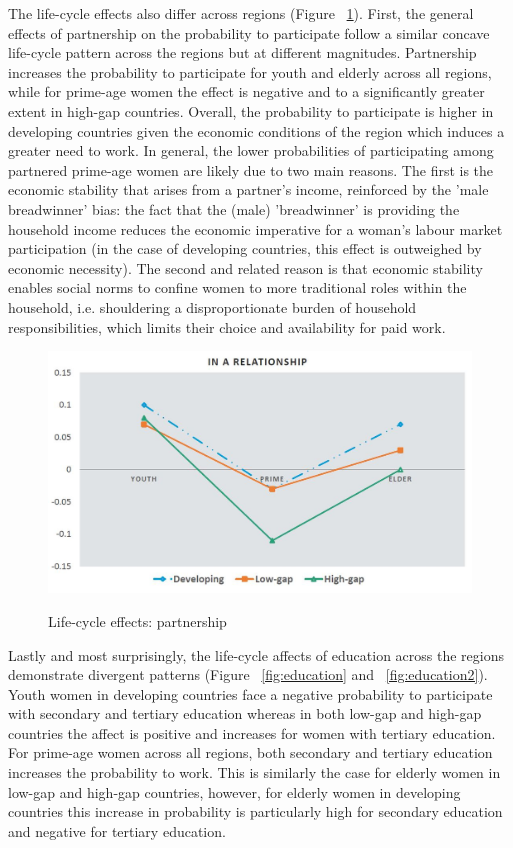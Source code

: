 The life-cycle effects also differ across regions (Figure ~\ref{fig:marriage}). First, the general effects of partnership on the probability to participate follow a similar concave life-cycle pattern across the regions but at different magnitudes. Partnership increases the probability to participate for youth and elderly across all regions, while for prime-age women the effect is negative and to a significantly greater extent in high-gap countries. Overall, the probability to participate is higher in developing countries given the economic conditions of the region which induces a greater need to work. In general, the lower probabilities of participating among partnered prime-age women are likely due to two main reasons. The first is the economic stability that arises from a partner's income, reinforced by the 'male breadwinner' bias: the fact that the (male) 'breadwinner' is providing the household income reduces the economic imperative for a woman's labour market participation (in the case of developing countries, this effect is outweighed by economic necessity). The second and related reason is that economic stability enables social norms to confine women to more traditional roles within the household, i.e. shouldering a disproportionate burden of household responsibilities, which limits their choice and availability for paid work.

\begin{figure}[htb]
	\centering
	\caption{Life-cycle effects: partnership}
	\includegraphics[width=120mm,keepaspectratio,height=0.6\textheight]{Figures/relationship}
	\label{fig:marriage}
\end{figure}

Lastly and most surprisingly, the life-cycle affects of education across the regions demonstrate divergent patterns (Figure ~\ref{fig:education} and ~\ref{fig:education2}). Youth women in developing countries face a negative probability to participate with secondary and tertiary education whereas in both low-gap and high-gap countries the affect is positive and increases for women with tertiary education. For prime-age women across all regions, both secondary and tertiary education increases the probability to work. This is similarly the case for elderly women in low-gap and high-gap countries, however, for elderly women in developing countries this increase in probability is particularly high for secondary education and negative for tertiary education. 

